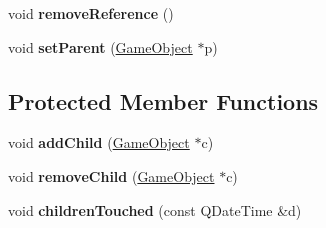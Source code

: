 \begin{DoxyCompactItemize}
\item 
\hypertarget{class_game_object_a68725fd75f55bc73bb44216406ce34e5}{void {\bfseries remove\-Reference} ()}\label{class_game_object_a68725fd75f55bc73bb44216406ce34e5}

\item 
\hypertarget{class_game_object_ae34944b23d5d7d472d5c8da3f42fb2e3}{void {\bfseries set\-Parent} (\hyperlink{class_game_object}{\-Game\-Object} $\ast$p)}\label{class_game_object_ae34944b23d5d7d472d5c8da3f42fb2e3}

\end{DoxyCompactItemize}
\subsection*{\-Protected \-Member \-Functions}
\begin{DoxyCompactItemize}
\item 
\hypertarget{class_game_object_a4733a1081db3c2d0a9be225265283ad8}{void {\bfseries add\-Child} (\hyperlink{class_game_object}{\-Game\-Object} $\ast$c)}\label{class_game_object_a4733a1081db3c2d0a9be225265283ad8}

\item 
\hypertarget{class_game_object_a21dc679cb474b147b7d7d336117ffe58}{void {\bfseries remove\-Child} (\hyperlink{class_game_object}{\-Game\-Object} $\ast$c)}\label{class_game_object_a21dc679cb474b147b7d7d336117ffe58}

\item 
\hypertarget{class_game_object_a4e57d5a3f8be6882e5d7f2a2e5d45ccd}{void {\bfseries children\-Touched} (const \-Q\-Date\-Time \&d)}\label{class_game_object_a4e57d5a3f8be6882e5d7f2a2e5d45ccd}

\end{DoxyCompactItemize}
